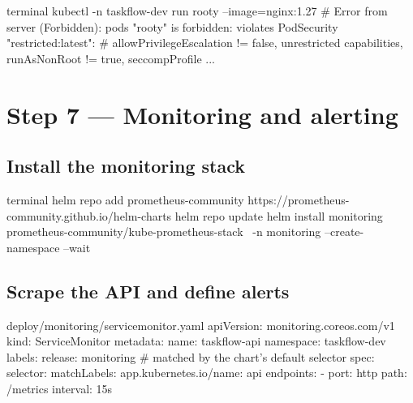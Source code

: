 \begin{bashcode}{terminal}
kubectl -n taskflow-dev run rooty --image=nginx:1.27
# Error from server (Forbidden): pods "rooty" is forbidden: violates PodSecurity "restricted:latest":
#   allowPrivilegeEscalation != false, unrestricted capabilities, runAsNonRoot != true, seccompProfile ...
\end{bashcode}

\section{Step 7 --- Monitoring and alerting}

\subsection{Install the monitoring stack}

\begin{bashcode}{terminal}
helm repo add prometheus-community https://prometheus-community.github.io/helm-charts
helm repo update
helm install monitoring prometheus-community/kube-prometheus-stack \
  -n monitoring --create-namespace --wait
\end{bashcode}

\subsection{Scrape the API and define alerts}

\begin{yamlcode}{deploy/monitoring/servicemonitor.yaml}
apiVersion: monitoring.coreos.com/v1
kind: ServiceMonitor
metadata:
  name: taskflow-api
  namespace: taskflow-dev
  labels:
    release: monitoring              # matched by the chart's default selector
spec:
  selector:
    matchLabels:
      app.kubernetes.io/name: api
  endpoints:
    - port: http
      path: /metrics
      interval: 15s
\end{yamlcode}


